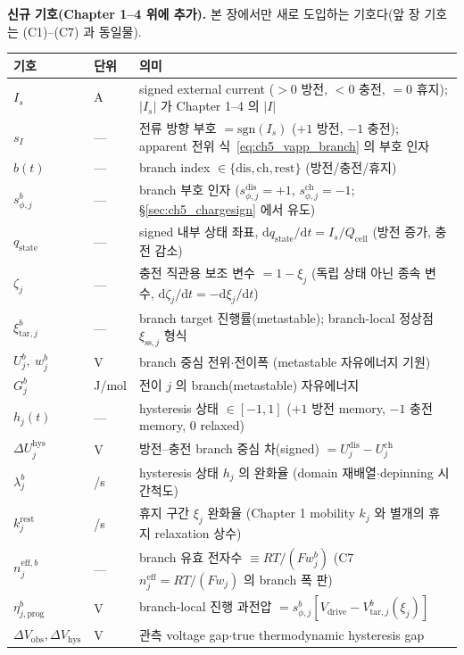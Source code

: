 \documentclass[11pt,a4paper]{article}
\newcommand{\dd}{\mathrm{d}}
\newcommand{\eff}{\mathrm{eff}}
\newcommand{\drive}{\mathrm{drive}}
\newcommand{\cell}{\mathrm{cell}}
\newcommand{\sstat}{\mathrm{ss}}
\newcommand{\dis}{\mathrm{dis}}
\newcommand{\chg}{\mathrm{ch}}
\newcommand{\rst}{\mathrm{rest}}
\newcommand{\hys}{\mathrm{hys}}
\newcommand{\obs}{\mathrm{obs}}
\newcommand{\tar}{\mathrm{tar}}
\newcommand{\stt}{\mathrm{state}}
\newcommand{\prog}{\mathrm{prog}}
\begin{document}
\textbf{신규 기호(Chapter 1--4 위에 추가).} 본 장에서만 새로 도입하는 기호다(앞 장 기호는 (C1)--(C7) 과 동일물).
\begin{longtable}{>{\raggedright\arraybackslash}p{} >{\raggedright\arraybackslash}p{} >{\raggedright\arraybackslash}p{}}
\toprule 기호 & 단위 & 의미 \\ \midrule \endhead
$I_s$ & A & signed external current ($>0$ 방전, $<0$ 충전, $=0$ 휴지); $|I_s|$ 가 Chapter 1--4 의 $|I|$ \\
$s_I$ & --- & 전류 방향 부호 $=\mathrm{sgn}(I_s)$ ($+1$ 방전, $-1$ 충전); apparent 전위 식~\eqref{eq:ch5_vapp_branch} 의 부호 인자 \\
$b(t)$ & --- & branch index $\in\{\dis,\chg,\rst\}$ (방전/충전/휴지) \\
$s_{\phi,j}^b$ & --- & branch 부호 인자 ($s_{\phi,j}^\dis=+1$, $s_{\phi,j}^\chg=-1$; \S\ref{sec:ch5_chargesign} 에서 유도) \\
$q_\stt$ & --- & signed 내부 상태 좌표, $\dd q_\stt/\dd t=I_s/Q_\cell$ (방전 증가, 충전 감소) \\
$\zeta_j$ & --- & 충전 직관용 보조 변수 $=1-\xi_j$ (독립 상태 아닌 종속 변수, $\dd\zeta_j/\dd t=-\dd\xi_j/\dd t$) \\
$\xi_{\tar,j}^b$ & --- & branch target 진행률(metastable); branch-local 정상점 $\xi_{\sstat,j}$ 형식 \\
$U_j^b,\ w_j^b$ & V & branch 중심 전위$\cdot$전이폭 (metastable 자유에너지 기원) \\
$G_j^b$ & J/mol & 전이 $j$ 의 branch(metastable) 자유에너지 \\
$h_j(t)$ & --- & hysteresis 상태 $\in[-1,1]$ ($+1$ 방전 memory, $-1$ 충전 memory, $0$ relaxed) \\
$\Delta U_j^\hys$ & V & 방전--충전 branch 중심 차(signed) $=U_j^\dis-U_j^\chg$ \\
$\lambda_j^b$ & 1/s & hysteresis 상태 $h_j$ 의 완화율 (domain 재배열$\cdot$depinning 시간척도) \\
$k_j^\rst$ & 1/s & 휴지 구간 $\xi_j$ 완화율 (Chapter 1 mobility $k_j$ 와 별개의 휴지 relaxation 상수) \\
$n_j^{\eff,b}$ & --- & branch 유효 전자수 $\equiv RT/(Fw_j^b)$ (C7 $n_j^\eff=RT/(Fw_j)$ 의 branch 폭 판) \\
$\eta_{j,\prog}^b$ & V & branch-local 진행 과전압 $=s_{\phi,j}^b[V_\drive-V_{\tar,j}^b(\xi_j)]$ \\
$\Delta V_\obs,\Delta V_\hys$ & V & 관측 voltage gap$\cdot$true thermodynamic hysteresis gap \\

\end{longtable}
\end{document}
